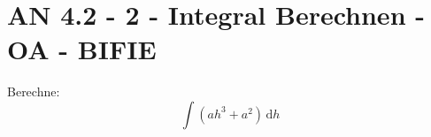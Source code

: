 \section{AN 4.2 - 2 - Integral Berechnen - OA - BIFIE}

\begin{beispiel}[AN 4.2]{1} %
				Berechne: $$\int{(ah^3+a^2)\,\text{d}h}$$
				\leer
				
\end{beispiel}